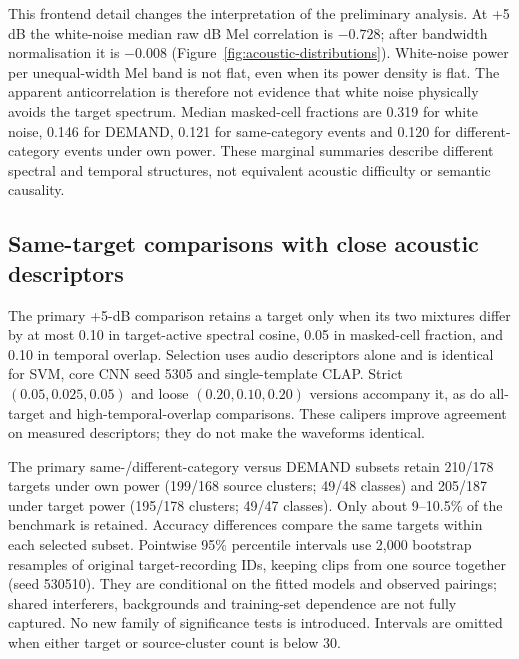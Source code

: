 This frontend detail changes the interpretation of the preliminary analysis.
At +5 dB the white-noise median raw dB Mel correlation is $-0.728$; after
bandwidth normalisation it is $-0.008$ (Figure~\ref{fig:acoustic-distributions}).
White-noise power per unequal-width Mel band is not flat, even when its power
density is flat. The apparent anticorrelation is therefore not evidence that
white noise physically avoids the target spectrum. Median masked-cell fractions
are 0.319 for white noise, 0.146 for DEMAND, 0.121 for same-category events and
0.120 for different-category events under own power. These marginal summaries
describe different spectral and temporal structures, not equivalent acoustic
difficulty or semantic causality.


\FloatBarrier
\subsection{Same-target comparisons with close acoustic descriptors}
The primary +5-dB comparison retains a target only when its two mixtures differ
by at most 0.10 in target-active spectral cosine, 0.05 in masked-cell fraction,
and 0.10 in temporal overlap. Selection uses audio descriptors alone and is
identical for SVM, core CNN seed 5305 and single-template CLAP. Strict
$(0.05,0.025,0.05)$ and loose $(0.20,0.10,0.20)$ versions accompany it, as do
all-target and high-temporal-overlap comparisons. These calipers improve
agreement on measured descriptors; they do not make the waveforms identical.

The primary same-/different-category versus DEMAND subsets retain 210/178
targets under own power (199/168 source clusters; 49/48 classes) and 205/187
under target power (195/178 clusters; 49/47 classes). Only about 9--10.5\% of
the benchmark is retained. Accuracy differences compare the same targets within
each selected subset. Pointwise 95\% percentile intervals use 2,000 bootstrap
resamples of original target-recording IDs, keeping clips from one source
together (seed 530510). They are conditional on the fitted models and observed
pairings; shared interferers, backgrounds and training-set dependence are not
fully captured. No new family of significance tests is introduced. Intervals
are omitted when either target or source-cluster count is below 30.

